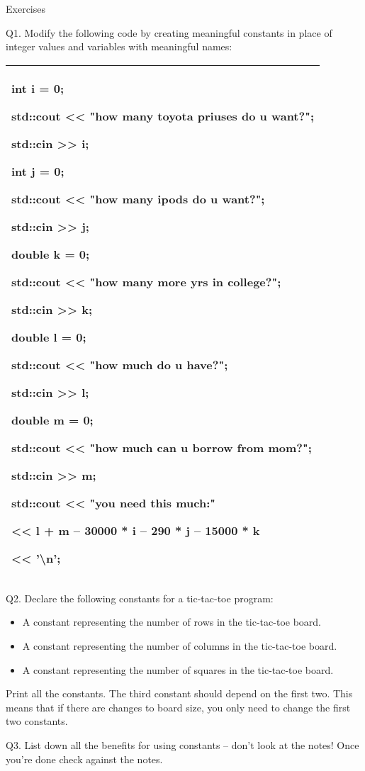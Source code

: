 \documentclass[
]{article}
\providecommand{\tightlist}{%
  \setlength{\itemsep}{0pt}\setlength{\parskip}{0pt}}
\begin{document}
Exercises

Q1. Modify the following code by creating meaningful constants in place
of integer values and variables with meaningful names:

\begin{longtable}[]{@{}l@{}}
\toprule
\endhead
\begin{minipage}[t]{0.97\columnwidth}\raggedright
int i = 0;

std::cout \textless\textless{} "how many toyota priuses do u want?";

std::cin \textgreater\textgreater{} i;

int j = 0;

std::cout \textless\textless{} "how many ipods do u want?";

std::cin \textgreater\textgreater{} j;

double k = 0;

std::cout \textless\textless{} "how many more yrs in college?";

std::cin \textgreater\textgreater{} k;

double l = 0;

std::cout \textless\textless{} "how much do u have?";

std::cin \textgreater\textgreater{} l;

double m = 0;

std::cout \textless\textless{} "how much can u borrow from mom?";

std::cin \textgreater\textgreater{} m;

std::cout \textless\textless{} "you need this much:"

\textless\textless{} l + m -- 30000 * i -- 290 * j -- 15000 * k

\textless\textless{} '\textbackslash n';\strut
\end{minipage}\tabularnewline
\bottomrule
\end{longtable}

Q2. Declare the following constants for a tic-tac-toe program:

\begin{itemize}
\tightlist
\item
  A constant representing the number of rows in the tic-tac-toe board.
\item
  A constant representing the number of columns in the tic-tac-toe
  board.
\item
  A constant representing the number of squares in the tic-tac-toe
  board.
\end{itemize}

Print all the constants. The third constant should depend on the first
two. This means that if there are changes to board size, you only need
to change the first two constants.

Q3. List down all the benefits for using constants -- don't look at the
notes! Once you're done check against the notes.
\end{document}
